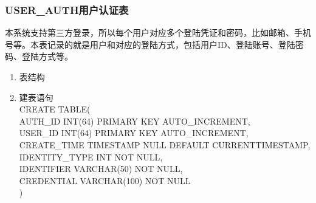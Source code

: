 \subsubsection{USER\_AUTH用户认证表}
本系统支持第三方登录，所以每个用户对应多个登陆凭证和密码，比如邮箱、手机号等。本表记录的就是用户和对应的登陆方式，包括用户ID、登陆账号、登陆密码、登陆方式等。
\begin{enumerate}
    \item 表结构
    \begin{table}[htbp]
        \centering
        \end{table}
    \item 建表语句\\
        CREATE TABLE(\\
            AUTH\_ID INT(64) PRIMARY KEY AUTO\_INCREMENT,\\
            USER\_ID INT(64) PRIMARY KEY AUTO\_INCREMENT,\\
            CREATE\_TIME TIMESTAMP NULL DEFAULT CURRENTTIMESTAMP,\\
            IDENTITY\_TYPE INT NOT NULL,\\
            IDENTIFIER VARCHAR(50) NOT NULL,\\
            CREDENTIAL VARCHAR(100) NOT NULL\\
        )
    \end{enumerate}

